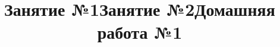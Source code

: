 \title{Занятие №1}
\begin{listofex}
	\item {}
	\item {}
	\item {}
	\item {}
	\item {}
	\item {}
	\item {}
	\item {}
\end{listofex}
\newpage
\title{Занятие №2}
\begin{listofex}
	\item {}
	\item {}
	\item {}
	\item {}
	\item {}
	\item {}
	\item {}
	\item {}
	\item {}
\end{listofex}
\newpage
\title{Домашняя работа №1}
\begin{listofex}
	\item {}
	\item {}
	\item {}
	\item {}
	\item {}
	\item {}
	\item {}
\end{listofex}
%
%
%
%
%
%
%
